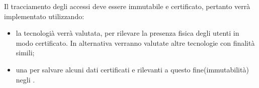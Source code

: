 Il tracciamento degli accessi deve essere immutabile e certificato, pertanto verrà implementato utilizzando:
\begin{itemize}
    \item la tecnologià  verrà valutata, per rilevare la presenza fisica degli utenti in modo certificato. In alternativa verranno valutate altre tecnologie con finalità simili;
    \item una  per salvare alcuni dati certificati e rilevanti a questo fine(immutabilità) negli .
\end{itemize}